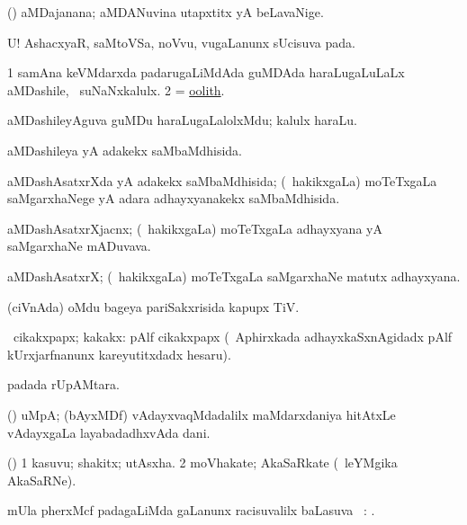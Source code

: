 \bentry
{}
\gl{\nA}
\bmng
(\jiVvi) aMDajanana; aMDANuvina utapxtitx yA beLavaNige. 
\emng
\eentry

\bentry
{}
\gl{\BAavayx}
\bmng
U! AshacxyaR, saMtoVSa, noVvu, \mo vugaLanunx sUcisuva pada. 
\emng
\eentry

\bentry
{}
\gl{\nA}
\bmng
\bnum
\num{1} samAna keVMdarxda padarugaLiMdAda guMDAda haraLugaLuLaLx aMDashile, \kanmu\ suNaNxkalulx. 
\num{2} = \hyperlink{oolith}{oolith}. 
\enum
\emng
\eentry

\bentry
{}
\gl{\nA}
\bmng
aMDashileyAguva guMDu haraLugaLalolxMdu; kalulx haraLu. 
\emng
\eentry

\bentry
{}
\gl{\gu}
\bmng
aMDashileya yA adakekx saMbaMdhisida. 
\emng
\eentry

\bentry
{}
\gl{\gu}
\bmng
aMDashAsatxrXda yA adakekx saMbaMdhisida; (\kanmu\ hakikxgaLa) moTeTxgaLa saMgarxhaNege yA adara adhayxyanakekx saMbaMdhisida. 
\emng
\eentry

\bentry
{}
\gl{\nA}
\bmng
aMDashAsatxrXjacnx; (\kanmu\ hakikxgaLa) moTeTxgaLa adhayxyana yA saMgarxhaNe mADuvava. 
\emng
\eentry

\bentry
{}
\gl{\nA}
\bmng
aMDashAsatxrX; (\kanmu\ hakikxgaLa) moTeTxgaLa saMgarxhaNe matutx adhayxyana. 
\emng
\eentry

\bentry
{}
\gl{\nA}
\bmng
(ciVnAda) oMdu bageya pariSakxrisida kapupx TiV. 
\emng
\eentry

\bentry
{}
\gl{\nA}
\bmng
\SAfr\ cikakxpapx; kakakx:  pAlf cikakxpapx (\da\ Aphirxkada adhayxkaSxnAgidadx pAlf kUrxjarfnanunx kareyutitxdadx hesaru). 
\emng
\eentry

\bentry
{}
\gl{\nA}
\bmng
{} padada rUpAMtara. 
\emng
\eentry

\bentry
{}
\gl{\nA}
\bmng
(\AmA) uMpA; (bAyxMDf) vAdayxvaqMdadalilx maMdarxdaniya hitAtxLe vAdayxgaLa layabadadhxvAda dani. 
\emng
\eentry

\bentry
{}
\gl{\nA}
\bmng
(\ashi) 
\bnum
\num{1} kasuvu; shakitx; utAsxha. 
\num{2} moVhakate; AkaSaRkate (\kanmu\ leYMgika AkaSaRNe). 
\enum
\emng
\eentry

\bentry
{}
\gl{\uparx}
\bmng
mUla pherxMcf padagaLiMda \nA gaLanunx racisuvalilx baLasuva \uparx\ : . 
\emng
\eentry

